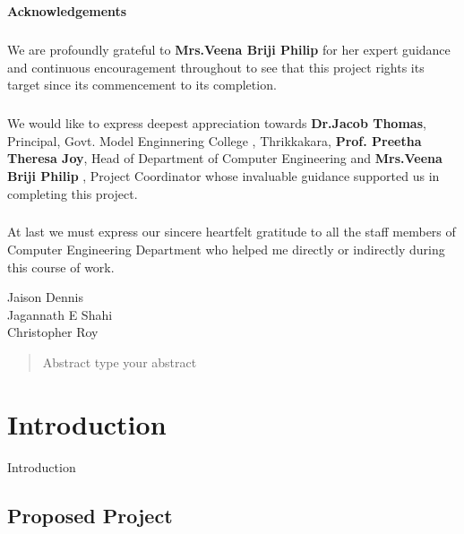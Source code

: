 \documentclass[11pt]{report}
\begin{document}
\begin{center}
	\thispagestyle{empty}
	\LARGE{\textbf{Acknowledgements}}\\[1cm]
\end{center}
\linespread{1.13}
\large{\paragraph{}We are profoundly grateful to \textbf{Mrs.Veena Briji Philip } for her expert guidance
	and continuous encouragement throughout to see that this project rights its
	target since its commencement to its completion.}
\large{\paragraph{}We would like to express deepest appreciation towards \textbf{Dr.Jacob Thomas},
	Principal, Govt. Model Enginnering College , Thrikkakara, \textbf{Prof. Preetha Theresa Joy}, 
	Head of Department of Computer Engineering and \textbf{Mrs.Veena Briji Philip }, Project Coordinator whose
	invaluable guidance supported us in completing this project.}
\large{\paragraph{}At last we must express our sincere heartfelt gratitude to all the staff members
	of Computer Engineering Department who helped me directly or indirectly during this course of work.}
\begin{flushright}
	{
		Jaison Dennis\\
		Jagannath E Shahi\\
		Christopher Roy
	}
\end{flushright}
\newpage
 
\begin{abstract}
Abstract
type your abstract
\end{abstract}

\tableofcontents





\chapter {Introduction}
\label{intro}
Introduction

\section{Proposed Project}
\end{document}
